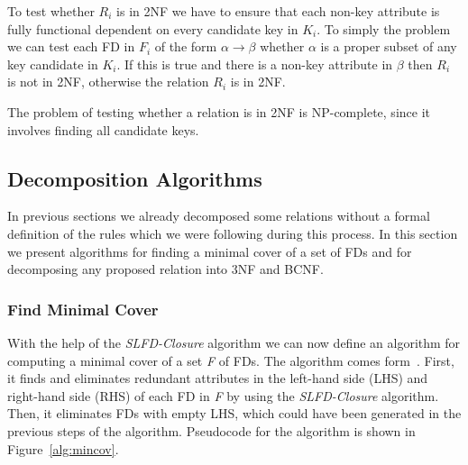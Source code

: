 To test whether $R_i$ is in 2NF we have to ensure that each non-key attribute is fully
functional dependent on every candidate key in $K_i$. To simply the problem we can test
each FD in $F_i$ of the form $\alpha \rightarrow \beta$ whether $\alpha$ is a proper subset
of any key candidate in $K_i$. If this is true and there is a non-key attribute in $\beta$ then
$R_i$ is not in 2NF, otherwise the relation $R_i$ is in 2NF.

The problem of testing whether a relation is in 2NF is NP-complete, 
since it involves finding all candidate keys.

\subsection{Decomposition Algorithms}
\label{sec:algdec}
In previous sections we already decomposed some relations without
a formal definition of the rules which we were following during this process. 
In this section we present algorithms for finding a minimal cover of a set of FDs and 
for decomposing any proposed relation into 3NF and BCNF.  

\subsubsection{Find Minimal Cover}  
With the help of the \textit{SLFD-Closure} algorithm we can now define an algorithm 
for computing a minimal cover of a set \textit{F} of FDs. 
The algorithm comes form~\cite[Section 6.3.1]{bdb2}. First, it finds and eliminates 
redundant attributes in the left-hand side (LHS) and right-hand side (RHS) 
of each FD in \textit{F} by using the \textit{SLFD-Closure} algorithm. Then, it eliminates FDs with 
empty LHS, which could have been generated in the previous steps of the algorithm. 
Pseudocode for the algorithm is shown in Figure~\ref{alg:mincov}.

